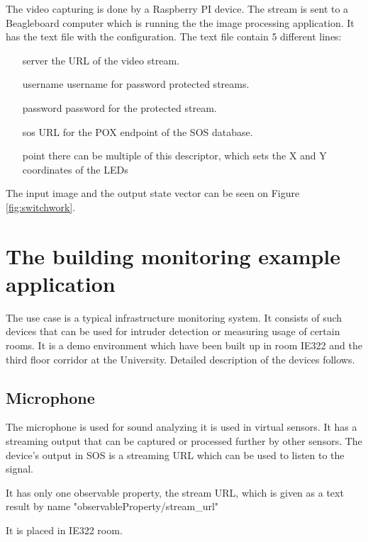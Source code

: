 The video capturing is done by a Raspberry PI device. The stream is sent to a Beagleboard computer which is running the the image processing application. It has the text file with the configuration. The text file contain 5 different lines:
\begin{itemize}
	\item[server] the URL of the video stream.
	\item[username] username for password protected streams.
	\item[password] password for the protected stream.
	\item[sos] URL for the POX endpoint of the SOS database.
	\item[point] there can be multiple of this descriptor, which sets the X and Y coordinates of the LEDs
\end{itemize}	
The input image and the output state vector can be seen on Figure \ref{fig:switchwork}.


\section{The building monitoring example application}

The use case is a typical infrastructure monitoring system. It consists of such devices that can be used for intruder detection or measuring usage of certain rooms. It is a demo environment which have been built up in room IE322 and the third floor corridor at the University.
Detailed description of the devices follows.

\subsection*{Microphone}
 The microphone is used for sound analyzing it is used in virtual sensors. It has a streaming output that can be captured or processed further by other sensors. The device's output in SOS is a streaming URL which can be used to listen to the signal. 
 
 It has only one observable property, the stream URL, which is given as a text result by name "observableProperty/stream\_url"
 
 It is placed in IE322 room.
 

